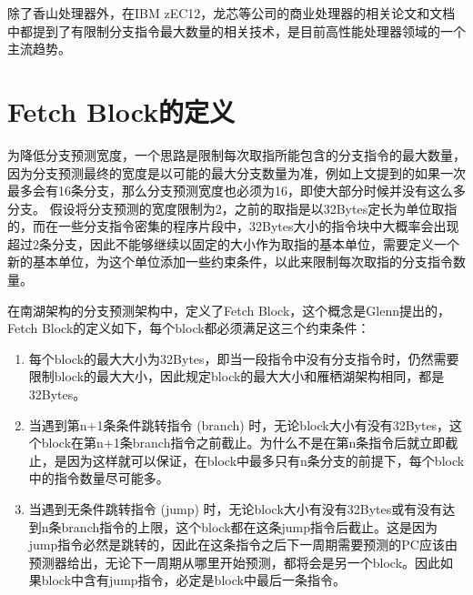 除了香山处理器外，在IBM zEC12\cite{ibm-zec12}，龙芯\cite{loongson}等公司的商业处理器的相关论文和文档中都提到了有限制分支指令最大数量的相关技术，是目前高性能处理器领域的一个主流趋势。


\section{Fetch Block的定义}

为降低分支预测宽度，一个思路是限制每次取指所能包含的分支指令的最大数量，因为分支预测最终的宽度是以可能的最大分支数量为准，例如上文提到的如果一次最多会有16条分支，那么分支预测宽度也必须为16，即使大部分时候并没有这么多分支。
假设将分支预测的宽度限制为2，之前的取指是以32Bytes定长为单位取指的，而在一些分支指令密集的程序片段中，32Bytes大小的指令块中大概率会出现超过2条分支，因此不能够继续以固定的大小作为取指的基本单位，需要定义一个新的基本单位，为这个单位添加一些约束条件，以此来限制每次取指的分支指令数量。

在南湖架构的分支预测架构中，定义了Fetch Block，这个概念是Glenn\cite{scalable-frontend}提出的，Fetch Block的定义如下，每个block都必须满足这三个约束条件：

\begin{enumerate}
    \item 每个block的最大大小为32Bytes，即当一段指令中没有分支指令时，仍然需要限制block的最大大小，因此规定block的最大大小和雁栖湖架构相同，都是32Bytes。
    \item 当遇到第n+1条条件跳转指令 (branch) 时，无论block大小有没有32Bytes，这个block在第n+1条branch指令之前截止。为什么不是在第n条指令后就立即截止，是因为这样就可以保证，在block中最多只有n条分支的前提下，每个block中的指令数量尽可能多。
    \item 当遇到无条件跳转指令 (jump) 时，无论block大小有没有32Bytes或有没有达到n条branch指令的上限，这个block都在这条jump指令后截止。这是因为jump指令必然是跳转的，因此在这条指令之后下一周期需要预测的PC应该由预测器给出，无论下一周期从哪里开始预测，都将会是另一个block。因此如果block中含有jump指令，必定是block中最后一条指令。
\end{enumerate}


